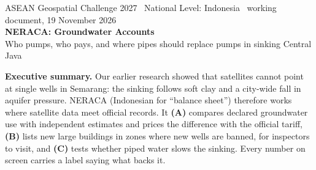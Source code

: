 \thispagestyle{empty}
\newcommand{\xhead}[2]{\par\vspace{2.2mm}\noindent
  {\sffamily\bfseries\small\color{accent}\MakeUppercase{#1}}\hfill{\sffamily\scriptsize\color{muted}#2}\\[-7pt]
  {\color{line}\rule{\linewidth}{0.5pt}}\par\vspace{0.6mm}}
\newcommand{\tilebig}[2]{{\sffamily\bfseries\fontsize{19}{21}\selectfont\color{#1}#2}\\[2pt]}

\begin{center}
{\sffamily\scriptsize\color{muted} ASEAN Geospatial Challenge 2027 \textbullet\ National Level: Indonesia \textbullet\ working document, 19 November 2026}\\[3mm]
{\sffamily\bfseries\fontsize{24}{27}\selectfont\color{ink} NERACA: Groundwater Accounts}\\[2mm]
{\sffamily\large\color{accent} Who pumps, who pays, and where pipes should replace pumps in sinking Central Java}
\end{center}
\vspace{-1mm}

\begin{tcolorbox}[enhanced,colback=accent,colframe=accent,boxrule=0pt,arc=2pt,left=10pt,right=10pt,top=7pt,bottom=7pt]
\sffamily\color{white}\textbf{Executive summary.} Our earlier research showed that satellites cannot point at
single wells in Semarang: the sinking follows soft clay and a city-wide fall in aquifer pressure. NERACA
(Indonesian for ``balance sheet'') therefore works where satellite data meet official records. It
\textbf{(A)} compares declared groundwater use with independent estimates and prices the difference with the
official tariff, \textbf{(B)} lists new large buildings in zones where new wells are banned, for inspectors
to visit, and \textbf{(C)} tests whether piped water slows the sinking. Every number on screen carries a
label saying what backs it.
\end{tcolorbox}

